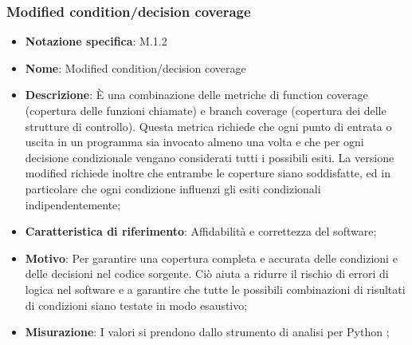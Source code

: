 \subsubsection{Modified condition/decision coverage}
\begin{itemize}
    \item \textbf{Notazione specifica}: M.1.2
    \item \textbf{Nome}: Modified condition/decision coverage
    \item \textbf{Descrizione}: È una combinazione delle metriche di function coverage (copertura delle funzioni chiamate) e branch coverage (copertura dei  delle strutture di controllo). Questa metrica richiede che ogni punto di entrata o uscita in un programma sia invocato almeno una volta e che per ogni decisione condizionale vengano considerati tutti i possibili esiti. La versione modified richiede inoltre che entrambe le coperture siano soddisfatte, ed in particolare che ogni condizione influenzi gli esiti condizionali indipendentemente;
    \item \textbf{Caratteristica di riferimento}: Affidabilità e correttezza del software;
    \item \textbf{Motivo}: Per garantire una copertura completa e accurata delle condizioni e delle decisioni nel codice sorgente. Ciò aiuta a ridurre il rischio di errori di logica nel software e a garantire che tutte le possibili combinazioni di risultati di condizioni siano testate in modo esaustivo;
    \item \textbf{Misurazione}: I valori si prendono dallo strumento di analisi per Python ;

\end{itemize}
